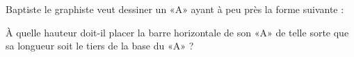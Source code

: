 
\begin{exercice}\label{exo2smath-0010}

    Baptiste le graphiste veut dessiner un «A» ayant à peu près la forme suivante :


\begin{center}
   
\end{center}


    À quelle hauteur doit-il placer la barre horizontale de son «A» de telle sorte que sa longueur soit le tiers de la base du «A» ?

\end{exercice}
